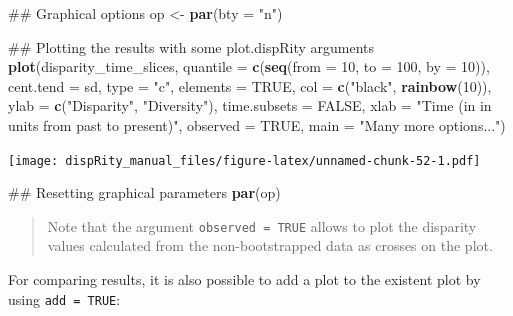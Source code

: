 \documentclass[]{book}
\newenvironment{Shaded}{\begin{snugshade}}{\end{snugshade}}
\newcommand{\KeywordTok}[1]{\textcolor[rgb]{0.13,0.29,0.53}{\textbf{#1}}}
\newcommand{\DataTypeTok}[1]{\textcolor[rgb]{0.13,0.29,0.53}{#1}}
\newcommand{\DecValTok}[1]{\textcolor[rgb]{0.00,0.00,0.81}{#1}}
\newcommand{\StringTok}[1]{\textcolor[rgb]{0.31,0.60,0.02}{#1}}
\newcommand{\OtherTok}[1]{\textcolor[rgb]{0.56,0.35,0.01}{#1}}
\newcommand{\NormalTok}[1]{#1}
\theoremstyle{definition}
\theoremstyle{definition}
\theoremstyle{remark}
\begin{document}
\begin{Shaded}
\begin{Highlighting}[]
\NormalTok{## Graphical options}
\NormalTok{op <-}\StringTok{ }\KeywordTok{par}\NormalTok{(}\DataTypeTok{bty =} \StringTok{"n"}\NormalTok{)}

\NormalTok{## Plotting the results with some plot.dispRity arguments}
\KeywordTok{plot}\NormalTok{(disparity_time_slices, }\DataTypeTok{quantile =} \KeywordTok{c}\NormalTok{(}\KeywordTok{seq}\NormalTok{(}\DataTypeTok{from =} \DecValTok{10}\NormalTok{, }\DataTypeTok{to =} \DecValTok{100}\NormalTok{, }\DataTypeTok{by =} \DecValTok{10}\NormalTok{)),}
    \DataTypeTok{cent.tend =}\NormalTok{ sd, }\DataTypeTok{type =} \StringTok{"c"}\NormalTok{, }\DataTypeTok{elements =} \OtherTok{TRUE}\NormalTok{, }\DataTypeTok{col =} \KeywordTok{c}\NormalTok{(}\StringTok{"black"}\NormalTok{, }\KeywordTok{rainbow}\NormalTok{(}\DecValTok{10}\NormalTok{)),}
    \DataTypeTok{ylab =} \KeywordTok{c}\NormalTok{(}\StringTok{"Disparity"}\NormalTok{, }\StringTok{"Diversity"}\NormalTok{), }\DataTypeTok{time.subsets =} \OtherTok{FALSE}\NormalTok{,}
    \DataTypeTok{xlab =} \StringTok{"Time (in in units from past to present)"}\NormalTok{, }\DataTypeTok{observed =} \OtherTok{TRUE}\NormalTok{,}
    \DataTypeTok{main =} \StringTok{"Many more options..."}\NormalTok{)}
\end{Highlighting}
\end{Shaded}

\texttt{[image: dispRity\_manual\_files/figure-latex/unnamed-chunk-52-1.pdf]}

\begin{Shaded}
\begin{Highlighting}[]
\NormalTok{## Resetting graphical parameters}
\KeywordTok{par}\NormalTok{(op)}
\end{Highlighting}
\end{Shaded}

\begin{quote}
Note that the argument \texttt{observed\ =\ TRUE} allows to plot the
disparity values calculated from the non-bootstrapped data as crosses on
the plot.
\end{quote}

For comparing results, it is also possible to add a plot to the existent
plot by using \texttt{add\ =\ TRUE}:
\end{document}

